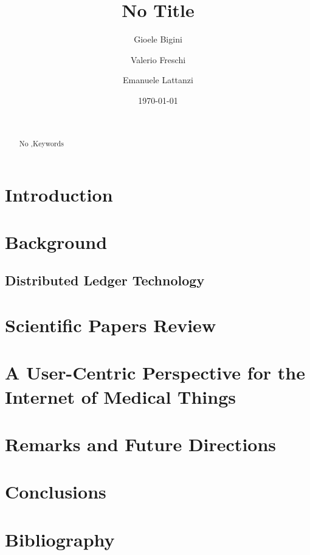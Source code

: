 \documentclass[preprint]{elsarticle}
\begin{document}
\title{No Title}

\author[1]{Gioele Bigini}%
\author[1]{Valerio Freschi}%
\author[1]{Emanuele Lattanzi}%


\address[1]{Department of Pure and Applied Sciences, University of Urbino\\Piazza della Repubblica 13, 61029 Urbino, Italy}

\begin{abstract}
\\

	\begin{keyword}
	No \sep Keywords
    \end{keyword}
\end{abstract}

\date{\today}
\maketitle

\section{Introduction}

\section{Background}
\subsection{Distributed Ledger Technology}



\section{Scientific Papers Review}

\section{A User-Centric Perspective for the Internet of Medical Things}

\section{Remarks and Future Directions}

\section{Conclusions}

\section*{Bibliography}


\end{document}
